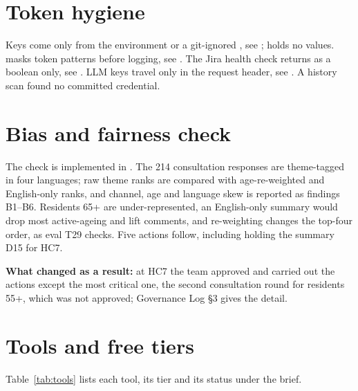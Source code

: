 \section{Token hygiene}

Keys come only from the environment or a git-ignored , see ;  holds no values.  masks token patterns before logging, see . The Jira health check returns  as a boolean only, see . LLM keys travel only in the request header, see . A history scan found no committed credential.

\section{Bias and fairness check}

The check is implemented in . The 214 consultation responses are theme-tagged in four languages; raw theme ranks are compared with age-re-weighted and English-only ranks, and channel, age and language skew is reported as findings B1--B6. Residents 65+ are under-represented, an English-only summary would drop most active-ageing and lift comments, and re-weighting changes the top-four order, as eval T29 checks. Five actions follow, including holding the summary D15 for HC7.

\textbf{What changed as a result:} at HC7 the team approved and carried out the actions except the most critical one, the second consultation round for residents 55+, which was not approved; Governance Log \S3 gives the detail.

\section{Tools and free tiers}

Table~\ref{tab:tools} lists each tool, its tier and its status under the brief.

